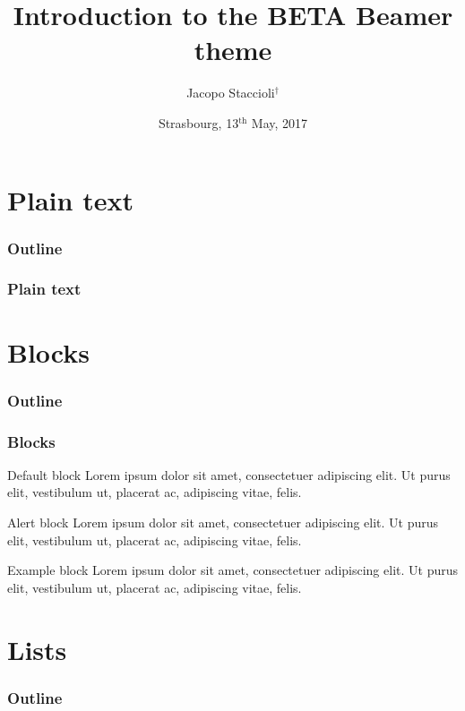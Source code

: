 \documentclass{beamer}
\title[Introduction to the BETA Beamer theme]{\Large{\textbf{Introduction to the BETA Beamer theme}}}
\author[Jacopo Staccioli]{Jacopo Staccioli$^{\dag}$}
\institute[Scuola Superiore Sant'Anna]{\newline \scriptsize{\textsl{$^{\dag}$Scuola Superiore Sant'Anna, Pisa}}\\[2ex] \small{\href{mailto:j.staccioli@sssup.it}{\color{blue} \texttt{j.staccioli@sssup.it}}}}
\date[13th May, 2017]{\vspace{-20pt}\footnotesize Strasbourg, 13$^{\text{th}}$ May, 2017}
\begin{document}
\begin{frame}
\maketitle
\end{frame}

\section{\bfseries Plain text}

\begin{frame}
\frametitle{\textbf{Outline}}
\tableofcontents[currentsection]
\end{frame}

\begin{frame}
\frametitle{\textbf{Plain text}}
\lipsum[1]
\end{frame}

\section{\bfseries Blocks}

\begin{frame}
\frametitle{\textbf{Outline}}
\tableofcontents[currentsection]
\end{frame}

\begin{frame}
\frametitle{\textbf{Blocks}}
\begin{block}{Default block}
Lorem ipsum dolor sit amet, consectetuer adipiscing elit. Ut purus elit, vestibulum ut, placerat ac, adipiscing vitae, felis.
\end{block}
\begin{alertblock}{Alert block}
Lorem ipsum dolor sit amet, consectetuer adipiscing elit. Ut purus elit, vestibulum ut, placerat ac, adipiscing vitae, felis.
\end{alertblock}
\begin{exampleblock}{Example block}
Lorem ipsum dolor sit amet, consectetuer adipiscing elit. Ut purus elit, vestibulum ut, placerat ac, adipiscing vitae, felis.
\end{exampleblock}
\end{frame}

\section{\bfseries Lists}

\begin{frame}
\frametitle{\textbf{Outline}}
\tableofcontents[currentsection]
\end{frame}
\end{document}
